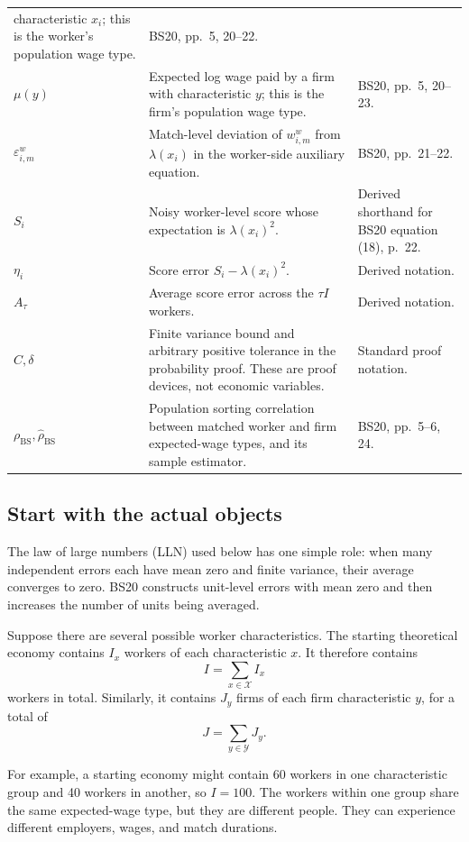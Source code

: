 \documentclass[11pt]{article}
\begin{document}
\begin{longtable}{p{}p{}p{}}
characteristic \(x_i\); this is the worker's population wage type. & BS20,
pp.\ 5, 20--22. \\
\(\mu(y)\) & Expected log wage paid by a firm with characteristic \(y\);
this is the firm's population wage type. & BS20, pp.\ 5, 20--23. \\
\(\varepsilon^w_{i,m}\) & Match-level deviation of
\(w^w_{i,m}\) from \(\lambda(x_i)\) in the worker-side auxiliary equation. &
BS20, pp.\ 21--22. \\
\(S_i\) & Noisy worker-level score whose expectation is
\(\lambda(x_i)^2\). & Derived shorthand for BS20 equation (18), p.\ 22. \\
\(\eta_i\) & Score error \(S_i-\lambda(x_i)^2\). & Derived notation. \\
\(A_\tau\) & Average score error across the \(\tau I\) workers. & Derived
notation. \\
\(C,\delta\) & Finite variance bound and arbitrary positive tolerance in
the probability proof.  These are proof devices, not economic variables. &
Standard proof notation. \\
\(\rho_{\mathrm{BS}},\widehat\rho_{\mathrm{BS}}\) & Population sorting
correlation between matched worker and firm expected-wage types, and its
sample estimator. & BS20, pp.\ 5--6, 24. \\
\end{longtable}

\subsection{Start with the actual objects}

The law of large numbers (LLN) used below has one simple role: when many
independent errors each have mean zero and finite variance, their average
converges to zero.  BS20 constructs unit-level errors with mean zero and
then increases the number of units being averaged.

Suppose there are several possible worker characteristics.  The starting
theoretical economy contains \(I_x\) workers of each characteristic \(x\).
It therefore contains
\[
I=\sum_{x\in\mathcal X}I_x
\tag{B.1}
\]
workers in total.  Similarly, it contains \(J_y\) firms of each firm
characteristic \(y\), for a total of
\[
J=\sum_{y\in\mathcal Y}J_y.
\tag{B.2}
\]

For example, a starting economy might contain 60 workers in one
characteristic group and 40 workers in another, so \(I=100\).  The workers
within one group share the same expected-wage type, but they are different
people.  They can experience different employers, wages, and match
durations.
\end{document}
